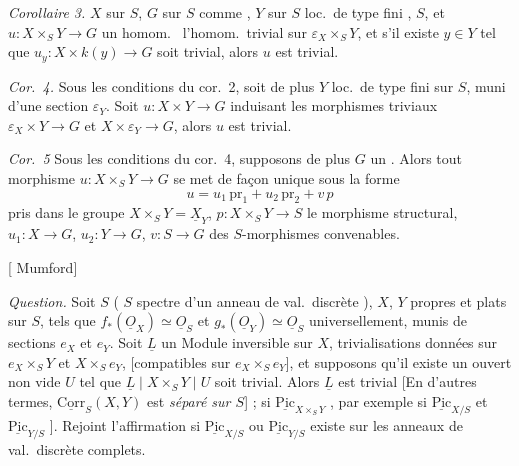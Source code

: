 \documentclass[11pt,a4paper]{article}
\begin{document}
\emph{Corollaire 3.} $X$ sur $S$, \struck{\ill{}}  $G$ sur $S$ comme \struck{\ill{}},  $Y$ sur $S$ loc.\ de type fini ,  $S$, et $u \colon X \times_S Y \to G$ un homom.\   \ill{} l'homom.\ trivial sur $\varepsilon_X \times_S Y$, et s'il existe $y \in Y$ tel que $u_y \colon X \times k(y) \to G$ soit trivial, alors $u$ est trivial.

\emph{Cor.~4.} Sous les conditions du cor.~2, soit de plus $Y$ loc.\ de type fini sur $S$,  muni d'une section $\varepsilon_Y$. Soit $u \colon X \times Y \to G$ induisant les morphismes triviaux $\varepsilon_X \times Y \to G$ et $X \times \varepsilon_Y \to G$, alors $u$ est trivial.

\emph{Cor.~5}  Sous les conditions du cor.~4, supposons  de plus $G$ un \ill{}. Alors tout morphisme $u \colon X \times_S Y \to G$ se met de façon unique sous la forme
\[
  u = u_1\, \mathrm{pr}_1 + u_2\, \mathrm{pr}_2 + v\, p
\]
pris dans le groupe $X \times_S Y = \underline{X}_Y$, $p \colon X \times_S Y \to S$ le morphisme structural, $u_1 \colon X \to G$, $u_2 \colon Y \to G$, $v \colon S \to G$ des $S$-morphismes convenables.

[ Mumford]

\emph{Question.} Soit $S$ ( \ill{} \ill{} \ill{} \ill{} \ill{} $S$ spectre d'un anneau de val.\ discrète ), $X$, $Y$ propres et plats sur $S$, tels que $f_*(\underline{O}_X) \simeq \underline{O}_S$ et $g_*(\underline{O}_Y) \simeq \underline{O}_S$ universellement, munis de sections $e_X$ et $e_Y$. Soit $\underline{L}$ un Module inversible sur $X$, \struck{\ill{}} trivialisations données sur $e_X \times_S Y$ et $X \times_S e_Y$, [compatibles sur $e_X \times_S e_Y$], et supposons qu'il existe un ouvert non vide $U$ tel que $\underline{L} \mid X \times_S Y \mid U$ soit trivial. Alors $\underline{L}$ est trivial [En d'autres termes, $\underline{\mathrm{Corr}}_S(X, Y)$ est  \emph{séparé sur $S$}] ;  si \struck{\ill{}} $\underline{\mathrm{Pic}}_{X \times_S Y}$ \ill{} \ill{} \ill{}, par exemple si $\underline{\mathrm{Pic}}_{X/S}$ et $\underline{\mathrm{Pic}}_{Y/S}$ \ill{} \ill{} \ill{}]. Rejoint l'affirmation si $\underline{\mathrm{Pic}}_{X/S}$ ou $\underline{\mathrm{Pic}}_{Y/S}$ existe sur les anneaux de val.\ discrète complets.  \struck{\ill{} \ill{} \ill{} \ill{} \ill{}}
\end{document}
